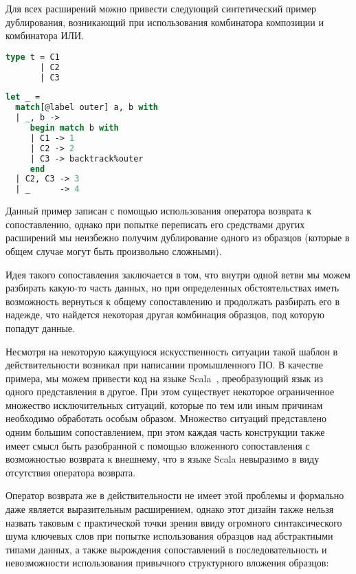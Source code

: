 Для всех расширений можно привести следующий синтетический пример дублирования, возникающий при использования комбинатора композиции и комбинатора ИЛИ.

\noindent
\begin{minipage}{\linewidth}
\begin{lstlisting}[language=ocaml, escapechar=@]
type t = C1
       | C2
       | C3
\end{lstlisting}
\end{minipage}

\noindent
\begin{minipage}{\linewidth}
\begin{lstlisting}[language=ocaml]
let _ =
  match[@label outer] a, b with
  | _, b ->
     begin match b with
     | C1 -> 1
     | C2 -> 2
     | C3 -> backtrack%outer
     end
  | C2, C3 -> 3
  | _      -> 4
\end{lstlisting}
\end{minipage}

Данный пример записан с помощью использования оператора возврата к сопоставлению, однако при попытке переписать его средствами других расширений мы неизбежно получим дублирование одного из образцов (которые в общем случае могут быть произвольно сложными). 

Идея такого сопоставления заключается в том, что внутри одной ветви мы можем разбирать какую-то часть данных, но при определенных обстоятельствах иметь возможность вернуться к общему сопоставлению и продолжать разбирать его в надежде, что найдется некоторая другая комбинация образцов, под которую попадут данные. 

Несмотря на некоторую кажущуюся искусственность ситуации такой шаблон в действительности возникал при написании промышленного ПО. В качестве примера, мы можем привести код на языке Scala~\cite{unexpresiveness_example}, преобразующий язык из одного представления в другое. При этом существует некоторое ограниченное множество исключительных ситуаций, которые по тем или иным причинам необходимо обработать особым образом. Множество ситуаций представлено одним большим сопоставлением, при этом каждая часть конструкции также имеет смысл быть разобранной с помощью вложенного сопоставления с возможностью возврата к внешнему, что в языке Scala невыразимо в виду отсутствия оператора возврата.

Оператор возврата же в действительности не имеет этой проблемы и формально даже является выразительным расширением, однако этот дизайн также нельзя назвать таковым с практической точки зрения ввиду огромного синтаксического шума ключевых слов при попытке использования образцов над абстрактными типами данных, а также вырождения сопоставлений в последовательность и невозможности использования привычного структурного вложения образцов:

